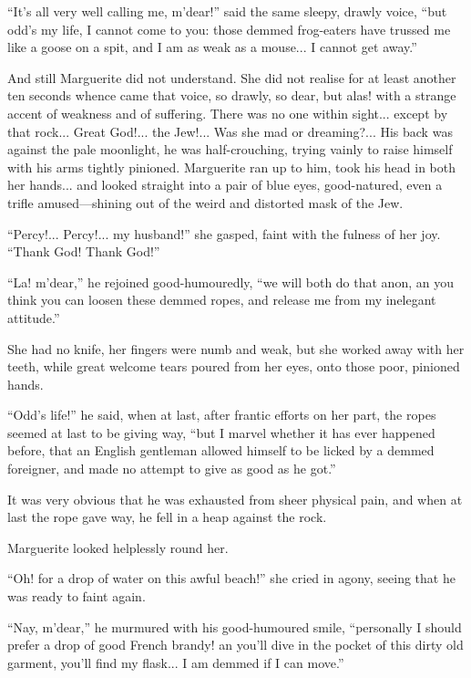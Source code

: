\documentclass[paper=5.5in:8.5in,BCOR=7mm,twoside,DIV=calc,12pt,usegeometry,chapterprefix,endperiod,headings=big]{scrbook}
\begin{document}
\enquote{It's all very well calling me, m'dear!} said the same sleepy, drawly voice, \enquote{but odd's my life, I cannot come to you: those demmed frog-eaters have trussed me like a goose on a spit, and I am as weak as a mouse... I cannot get away.}

And still Marguerite did not understand. She did not realise for at least another ten seconds whence came that voice, so drawly, so dear, but alas! with a strange accent of weakness and of suffering. There was no one within sight... except by that rock... Great God!... the Jew!... Was she mad or dreaming?... His back was against the pale moonlight, he was half-crouching, trying vainly to raise himself with his arms tightly pinioned. Marguerite ran up to him, took his head in both her hands... and looked straight into a pair of blue eyes, good-natured, even a trifle amused---shining out of the weird and distorted mask of the Jew.

\enquote{Percy!... Percy!... my husband!} she gasped, faint with the fulness of her joy. \enquote{Thank God! Thank God!}

\enquote{La! m'dear,} he rejoined good-humouredly, \enquote{we will both do that anon, an you think you can loosen these demmed ropes, and release me from my inelegant attitude.}

She had no knife, her fingers were numb and weak, but she worked away with her teeth, while great welcome tears poured from her eyes, onto those poor, pinioned hands.

\enquote{Odd's life!} he said, when at last, after frantic efforts on her part, the ropes seemed at last to be giving way, \enquote{but I marvel whether it has ever happened before, that an English gentleman allowed himself to be licked by a demmed foreigner, and made no attempt to give as good as he got.}

It was very obvious that he was exhausted from sheer physical pain, and when at last the rope gave way, he fell in a heap against the rock.

Marguerite looked helplessly round her.

\enquote{Oh! for a drop of water on this awful beach!} she cried in agony, seeing that he was ready to faint again.

\enquote{Nay, m'dear,} he murmured with his good-humoured smile, \enquote{personally I should prefer a drop of good French brandy! an you'll dive in the pocket of this dirty old garment, you'll find my flask... I am demmed if I can move.}
\end{document}
